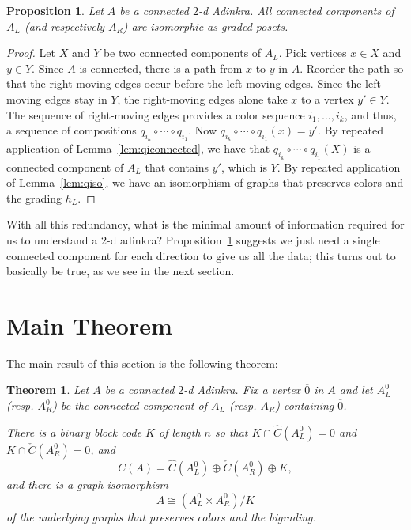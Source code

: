 \documentclass[12pt,twoside,singlespace]{article}
\numberwithin{equation}{section}
\newtheorem{thm}[equation]{Theorem}
\newtheorem{prop}[equation]{Proposition}
\theoremstyle{definition}
\begin{document}
\begin{prop}
\label{prop:kevin}
Let $A$ be a connected $2$-d Adinkra.  All connected components of $A_L$ (and respectively $A_R$) are isomorphic as graded posets.
\end{prop}
\begin{proof}
Let $X$ and $Y$ be two connected components of $A_L$. Pick vertices $x \in X$ and $y \in Y$. Since $A$ is connected, there is a path from $x$ to $y$ in $A$. Reorder the path so that the right-moving edges occur before the left-moving edges. Since the left-moving edges stay in $Y$, the right-moving edges alone take $x$ to a vertex $y' \in Y$.  The sequence of right-moving edges provides a color sequence $i_1,\ldots,i_k$, and thus, a sequence of compositions $q_{i_k}\circ\cdots\circ q_{i_1}$.  Now $q_{i_k}\circ\cdots\circ q_{i_1}(x)=y'$.  By repeated application of Lemma~\ref{lem:qiconnected}, we have that $q_{i_k}\circ\cdots\circ q_{i_1}(X)$ is a connected component of $A_L$ that contains $y'$, which is $Y$.  By repeated application of Lemma~\ref{lem:qiso}, we have an isomorphism of graphs that preserves colors and the grading $h_L$.
\end{proof}

With all this redundancy, what is the minimal amount of information required for us to understand a $2$-d adinkra? Proposition~\ref{prop:kevin} suggests we just need a single connected component for each direction to give us all the data; this turns out to basically be true, as we see in the next section.




\section{Main Theorem}

The main result of this section is the following theorem:
\begin{thm}
\label{thm:quotient}
Let $A$ be a connected $2$-d Adinkra.  Fix a vertex $\overline{0}$ in $A$ and let $A_L^0$ (resp. $A_R^0$) be the connected component of $A_L$ (resp. $A_R$) containing $\overline{0}$.

There is a binary block code $K$ of length $n$ so that $K\cap \hat{C}(A_L^0)=0$ and $K\cap \check{C}(A_R^0)=0$, and
\[C(A)=\hat{C}(A_L^0)\oplus \check{C}(A_R^0)\oplus K,\]
and there is a graph isomorphism
\begin{equation}
\label{eqn:quotientiso}
A\cong (A_L^0\times A_R^0)/K
\end{equation}
of the underlying graphs that preserves colors and the bigrading.
\end{thm}
\end{document}
